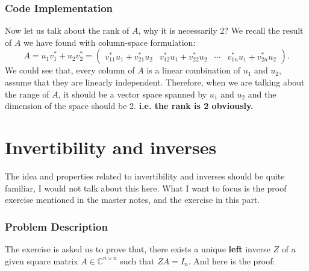 \subsubsection*{Code Implementation}

Now let us talk about the rank of $A$, why it is necessarily 2?
We recall the result of $A$ we have found with column-space formulation: 
\[
A = u_1v_1^{*} + u_2v_2^{*} = \begin{pmatrix} v_{11}^{*}u_1 + v_{21}^{*}u_2 & v_{12}^{*}u_1 + v_{22}^{*}u_2 & \cdots & v_{1n}^{*}u_1 + v_{2n}^{*}u_2 \end{pmatrix} 
.\]
We could see that, every column of $A$ is a linear combination of $u_1$ and $u_2$, assume that they are linearly independent. Therefore, when we are talking about the range of $A$, it should be a vector space spanned by $u_1$ and $u_2$ and the dimension of the space should be 2. \textbf{i.e. the rank is 2 obviously.} 
\newpage
\section{Invertibility and inverses}%
The idea and properties related to invertibility and inverses should be quite familiar, I would not talk about this here. What I want to focus is the proof exercise mentioned in the master notes, and the exercise in this part.
\subsubsection*{Problem Description}
The exercise is asked us to prove that, there exists a unique \textbf{left} inverse $Z$ of a given square matrix $A \in \mathbb{C}^{n \times n}$ such that $ZA = I_n$. And here is the proof:
